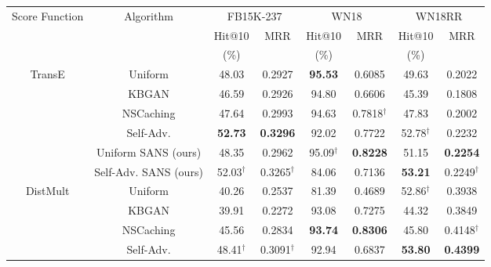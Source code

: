 
\begin{table*}[h]
\begin{small}
\centering
\begin{tabular}{cccccccc}
\hline
\multirow{3}{2cm}{\centering Score Function}& \multirow{3}{2cm}{Algorithm} & \multicolumn{2}{c}{FB15K-237} & \multicolumn{2}{c}{WN18} & \multicolumn{2}{c}{WN18RR} \\
& & Hit@10 & \multirow{2}{1cm}{\centering MRR} & Hit@10 & \multirow{2}{1cm}{\centering MRR} & Hit@10 & \multirow{2}{1cm}{\centering MRR} \\ 
& & (\%) & & (\%) & & (\%) & \\
\hline
\multirow{5}{1.5cm}{\centering TransE} & Uniform \cite{sun2019rotate} & 48.03 & 0.2927 & \textbf{95.53} & 0.6085 & 49.63 & 0.2022 \\
& KBGAN \cite{cai2017kbgan} & 46.59 & 0.2926 & 94.80 & 0.6606 & 45.39 & 0.1808 \\
& NSCaching \cite{zhang2019nscaching} & 47.64 & 0.2993 & 94.63 & 0.7818$^\dagger$ & 47.83 & 0.2002\\
& Self-Adv. \cite{sun2019rotate} & \textbf{52.73} & \textbf{0.3296} & 92.02 & 0.7722 & 52.78$^\dagger$ & 0.2232 \\
& Uniform SANS (ours) & 48.35 & 0.2962 & 95.09$^\dagger$ & \textbf{0.8228} & 51.15 & \textbf{0.2254} \\
& Self-Adv. SANS (ours) & 52.03$^\dagger$ & 0.3265$^\dagger$ & 84.06 & 0.7136 & \textbf{53.21} & 0.2249$^\dagger$ \\
\hline
\multirow{4}{1.5cm}{\centering DistMult} & Uniform & 40.26 & 0.2537 & 81.39  & 0.4689 & 52.86$^\dagger$ & 0.3938 \\
& KBGAN & 39.91 & 0.2272 & 93.08 & 0.7275 & 44.32 & 0.3849 \\
& NSCaching & 45.56 & 0.2834 & \textbf{93.74} & \textbf{0.8306} & 45.80 & 0.4148$^\dagger$ \\
& Self-Adv. & 48.41$^\dagger$ & 0.3091$^\dagger$ & 92.94  & 0.6837 & \textbf{53.80} & \textbf{0.4399} \\

\end{tabular}
\end{small}
\end{table*}
